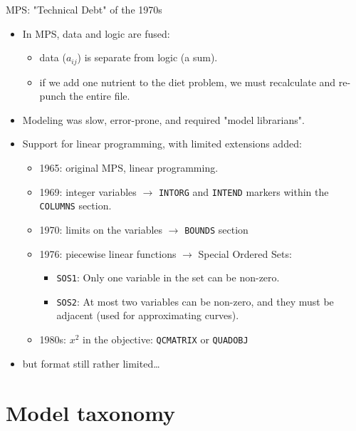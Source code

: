 \documentclass[presentation, aspectratio=169]{beamer}
\begin{document}
\begin{frame}[label={sec:orgcf0ca8c},fragile]{MPS: "Technical Debt" of the 1970s}
 \begin{itemize}
\item In MPS, data and logic are fused:
\begin{itemize}
\item data (\(a_{ij}\)) is separate from logic (a sum).
\item if we add one nutrient to the diet problem, we must recalculate and re-punch the entire file.
\end{itemize}
\item Modeling was slow, error-prone, and required "model librarians".
\item Support for linear programming, with limited extensions added:
\begin{itemize}
\item 1965: original MPS, linear programming.
\item 1969: integer variables \(\to\) \texttt{INTORG} and \texttt{INTEND} markers within the \texttt{COLUMNS} section.
\item 1970: limits on the variables \(\to\) \texttt{BOUNDS} section
\item 1976: piecewise linear functions \(\to\) Special Ordered Sets:
\begin{itemize}
\item \texttt{SOS1}: Only one variable in the set can be non-zero.
\item \texttt{SOS2}: At most two variables can be non-zero, and they must be adjacent (used for approximating curves).
\end{itemize}
\item 1980s: \(x^2\) in the objective: \texttt{QCMATRIX} or \texttt{QUADOBJ}
\end{itemize}
\item but format still rather limited\ldots{}
\end{itemize}
\end{frame}



\section{Model taxonomy}
\label{sec:org535ccfb}
\end{document}
